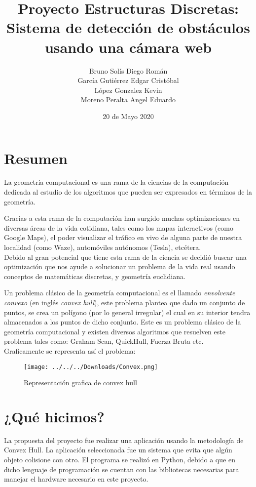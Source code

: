 \documentclass[11pt]{article}
\title{Proyecto Estructuras Discretas: Sistema de detección de obstáculos usando una cámara web}
\author{Bruno Solís Diego Román\\García Gutiérrez Edgar Cristóbal\\López Gonzalez Kevin\\Moreno Peralta Angel Eduardo }
\date{20 de Mayo 2020}
\begin{document}
\maketitle
\section{Resumen}
La geometría computacional es una rama de la ciencias de la computación dedicada al estudio de los algoritmos que pueden ser expresados en términos de la geometría.

Gracias a esta rama de la computación han surgido muchas optimizaciones en diversas áreas de la vida cotidiana, tales como los mapas interactivos (como Google Maps), el poder visualizar el tráfico en vivo de alguna parte de nuestra localidad (como Waze), automóviles autónomos (Tesla), etcétera.\\
Debido al gran potencial que tiene esta rama de la ciencia se decidió buscar una optimización que nos ayude a solucionar un problema de la vida real usando conceptos de matemáticas discretas, y geometría euclidiana.

Un problema clásico de la geometría computacional es el llamado \textit{envolvente convexo} (en inglés \textit{convex hull}), este problema plantea que dado un conjunto de puntos, se crea un polígono (por lo general irregular) el cual en su interior tendra almacenados a los puntos de dicho conjunto. Este es un problema clásico de la geometría computacional y existen diversos algoritmos que resuelven este problema tales como: Graham Scan, QuickHull, Fuerza Bruta etc.\\
Graficamente se representa así el problema:\\
\begin{figure}
\centering
\texttt{[image: ../../../Downloads/Convex.png]}
\caption{Representación grafica de convex hull}
\end{figure}



\section{¿Qué hicimos?}
La propuesta del proyecto fue realizar una aplicación usando la metodología de Convex Hull. La aplicación seleccionada fue un sistema que evita que algún objeto colisione con otro. El programa se realizó en Python, debido a que en dicho lenguaje de programación se cuentan con las bibliotecas necesarias para manejar el hardware necesario en este proyecto.
\end{document}
